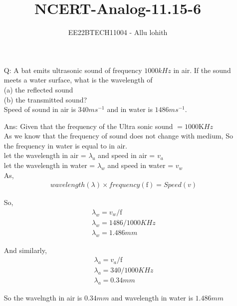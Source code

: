 \documentclass[journal,12pt,twocolumn]{IEEEtran}
\theoremstyle{remark}
\begin{document}

\vspace{3cm}

\title{NCERT-Analog-11.15-6}
\author{EE22BTECH11004 - Allu lohith}

\maketitle
\newpage
\bigskip

\renewcommand{\thefigure}{\theenumi}
\renewcommand{\thetable}{\theenumi}
\begin{enumerate}
\item[Q:] 
A bat emits ultrasonic sound of frequency $1000 kHz$ in air. If the sound meets a water surface, what is the wavelength of\\[0pt] (a) the reflected sound \\[0pt]
(b) the transmitted sound?\\
Speed of sound in air is $340 ms^{-1}$ and in water is $1486 ms^{-1}$.
\item[Ans:]
Given that the frequency of the Ultra sonic sound $= 1000$K$Hz$\\
As we know that the frequency of sound does not change with medium, So the frequency in water is equal to in air.\\
let the wavelength in air = $\lambda_a$  and  speed in air = $v_a$\\
let the wavelength in water = $\lambda_w$ and  speed in water = $v_w$ \\
As,
\begin{align}
wavelength(\lambda)\times frequency(\mathrm{f})=Speed(v)
\end{align}

So,
\begin{align}
\lambda_w=v_w/ \mathrm{f}\\
\lambda_w=1486/1000KHz\\
\lambda_w=1.486mm    
\end{align}

And similarly,
\begin{align}
\lambda_a=v_a/\mathrm{f}\\
\lambda_a=340/1000KHz\\
\lambda_a=0.34mm    
\end{align}

So the wavelngth in air is $0.34mm$ and wavelength in water is $1.486mm$
\end{enumerate}
\end{document}
